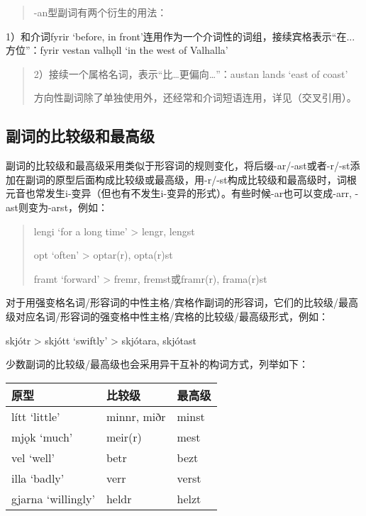 \begin{quote}
  -an型副词有两个衍生的用法：
\end{quote}

1）和介词fyrir `before, in
front‌'连用作为一个介词性的词组，接续宾格表示``在...方位''：fyrir vestan
valhǫll `in the west of Valhalla'

\begin{quote}
  2）接续一个属格名词，表示``比\ldots 更偏向\ldots''：austan lands `east
  of coast‌'

  方向性副词除了单独使用外，还经常和介词短语连用，详见（交叉引用）。
\end{quote}

\subsection{副词的比较级和最高级}\label{副词的比较级和最高级}

副词的比较级和最高级采用类似于形容词的规则变化，将后缀-ar/-ast或者-r/-st添加在副词的原型后面构成比较级或最高级，用-r/-st构成比较级和最高级时，词根元音也常发生i-变异（但也有不发生i-变异的形式）。有些时候-ar也可以变成-arr,
-ast则变为-arst，例如：

\begin{quote}
  lengi `for a long time' \textgreater{} lengr, lengst

  opt `often' \textgreater{} optar(r), opta(r)st

  framt `forward' \textgreater{} fremr, fremst或framr(r), frama(r)st
\end{quote}

对于用强变格名词/形容词的中性主格/宾格作副词的形容词，它们的比较级/最高级对应名词/形容词的强变格中性主格/宾格的比较级/最高级形式，例如：

skjótr \textgreater{} skjótt `swiftly' \textgreater{} skjótara, skjótast

少数副词的比较级/最高级也会采用异干互补的构词方式，列举如下：

\begin{longtable}{lll}
  \toprule
  原型               & 比较级      & 最高级 \\
  \midrule
  \endhead
  \bottomrule
  \endfoot
  lítt `little‌'      & minnr, miðr & minst  \\
  mjǫk `much‌'        & meir(r)     & mest   \\
  vel `well‌'         & betr        & bezt   \\
  illa `badly‌'       & verr        & verst  \\
  gjarna `willingly‌' & heldr       & helzt  \\
\end{longtable}

